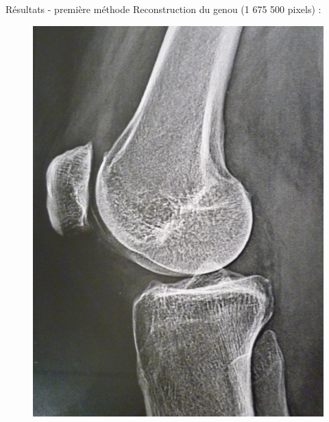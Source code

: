 \documentclass{beamer}
\begin{document}
\begin{frame}{Résultats - première méthode}
    Reconstruction du genou (1 675 500 pixels) : 
    \begin{figure}[t]
        \centering
        \includegraphics[scale = 0.1]{radio_genou.jpeg}
    \end{figure}
\end{frame}
\end{document}
